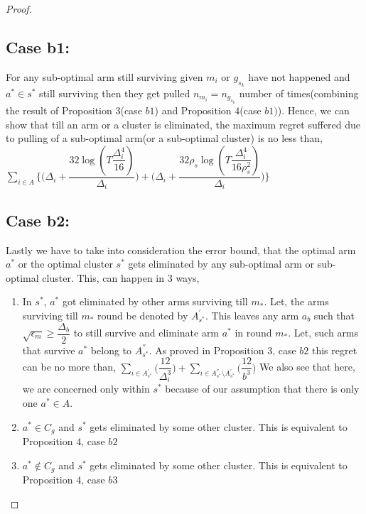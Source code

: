 \begin{proof}
\subsection{Case b1:} 
For any sub-optimal arm still surviving given $m_{i}$ or $g_{s_{k}}$ have not happened and $a^{*}\in s^{*}$ still surviving then they get pulled $n_{m_{i}}=n_{g_{s_{k}}}$ number of times(combining the result of Proposition $3$(case $b1$) and Proposition $4$(case $b1)$). Hence, we can show that till an arm or a cluster is eliminated, the maximum regret suffered due to pulling of a sub-optimal arm(or a sub-optimal cluster) is no less than,
\newline
$\sum_{i\in A}\bigg\lbrace\bigg(\Delta_{i}+\dfrac{32\log{(T\dfrac{\Delta_{i}^{4}}{16})}}{\Delta_{i}}\bigg) + \bigg(\Delta_{i}+\dfrac{32\rho_{s}\log{(T\dfrac{\Delta_{i}^{4}}{16\rho_{s}^{2}})}}{\Delta_{i}}\bigg)\bigg\rbrace $
\newline
\subsection{Case b2:} 
Lastly we have to take into consideration the error bound, that the optimal arm $a^{*}$ or the optimal cluster $s^{*}$ gets eliminated by any sub-optimal arm or sub-optimal cluster. This, can happen in $3$ ways,
\begin{enumerate}
\item In $s^{*}$, $a^{*}$ got eliminated by other arms surviving till $m_{*}$. Let, the arms surviving till $m_{*}$ round be denoted by $A^{'}_{s^{*}}$. This leaves any arm $a_{b}$ such that $\sqrt{\epsilon_{m}}\geq\dfrac{\Delta_{b}}{2}$ to still survive and eliminate arm $a^{*}$ in round $m_{*}$. Let, such arms that survive $a^{*}$ belong to $A^{''}_{s^{*}}$. As proved in Proposition $3$, case $b2$ this regret can be no more than,
\newline
$\sum_{i\in A^{'}_{s^{*}}}\bigg(\dfrac{12}{\Delta_{i}^{3}} \bigg)+\sum_{i\in A^{''}_{s^{*}}\setminus A^{'}_{s^{*}}}\bigg(\dfrac{12}{b^{3}} \bigg)$
\newline
We also see that here, we are concerned only within $s^{*}$ because of our assumption that there is only one $a^{*}\in A$.
\item $a^{*}\in C_{g}$ and $s^{*}$ gets eliminated by some other cluster. This is equivalent to Proposition $4$, case $b2$
\item $a^{*}\notin C_{g}$ and $s^{*}$ gets eliminated by some other cluster. This is equivalent to Proposition $4$, case $b3$
\end{enumerate} 



\end{proof}
